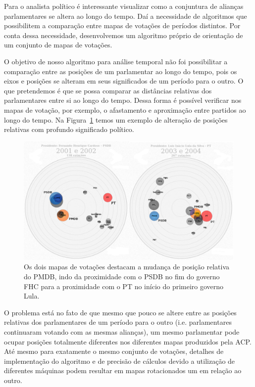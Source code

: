 \documentclass[
	article,			%
	12pt,				%
    twoside,			%
	a4paper,			%
	english,			%
	french,				%
	spanish,			%
	brazil,				%
	]{abntex2}
\begin{document}
Para o analista político é interessante visualizar como a conjuntura de alianças parlamentares se altera ao longo do tempo. Daí a necessidade de algoritmos que possibilitem a comparação entre mapas de votações de períodos distintos. Por conta dessa necessidade, desenvolvemos um algoritmo próprio de orientação de um conjunto de mapas de votações.

O objetivo de nosso algoritmo para análise temporal não foi possibilitar a comparação entre as posições de um parlamentar ao longo do tempo, pois os eixos e posições se alteram em seus significados de um período para o outro. O que pretendemos é que se possa comparar as distâncias relativas dos parlamentares entre si ao longo do tempo. Dessa forma é possível verificar nos mapas de votação, por exemplo, o afastamento e aproximação entre partidos ao longo do tempo. Na Figura~\ref{fig:fhc2-lula1} temos um exemplo de alteração de posições relativas com profundo significado político. \\

\begin{figure}[h]
  \centering
  \includegraphics[scale=0.37]{figs/fhc2-lula1.png}
  \caption{Os dois mapas de votações destacam a mudança de posição relativa do PMDB, indo da proximidade com o PSDB no fim do governo FHC para a proximidade com o PT no início do primeiro governo Lula.}
  \label{fig:fhc2-lula1}
\end{figure}

O problema está no fato de que mesmo que pouco se altere entre as posições relativas dos parlamentares de um período para o outro (i.e. parlamentares continuaram votando com as mesmas alianças), um mesmo parlamentar pode ocupar posições totalmente diferentes nos diferentes mapas produzidos pela ACP. Até mesmo para exatamente o mesmo conjunto de votações, detalhes de implementação do algoritmo e de precisão de cálculos devido a utilização de diferentes máquinas podem resultar em mapas rotacionados um em relação ao outro.
\end{document}
